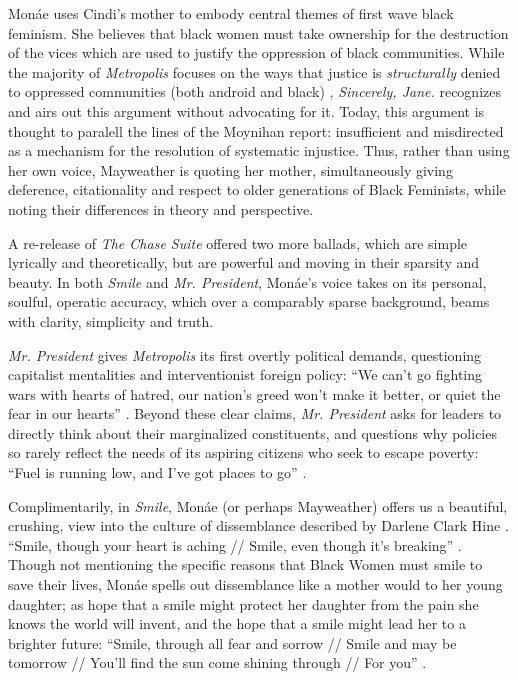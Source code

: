 \documentclass[a4paper, 11pt]{article} %
\begin{document}
Mon\'ae uses Cindi's mother to embody central themes of first wave black feminism.
She believes that black women must take ownership for the destruction of the vices which are used to justify the oppression of black communities. 
While the majority of \emph{Metropolis} focuses on the ways that justice is \emph{structurally} denied to oppressed communities (both android and black) \cite{queen}, \emph{Sincerely, Jane.} recognizes and airs out this argument without advocating for it.
Today, this argument is thought to paralell the lines of the Moynihan report: insufficient and misdirected as a mechanism for the resolution of systematic injustice. 
Thus, rather than using her own voice, Mayweather is quoting her mother, simultaneously giving deference, citationality and respect to older generations of Black Feminists, while noting their differences in theory and perspective.

A re-release of \emph{The Chase Suite} offered two more ballads, which are simple lyrically and theoretically, but are powerful and moving in their sparsity and beauty.
In both \emph{Smile} and \emph{Mr. President}, Mon\'ae's voice takes on its personal, soulful, operatic accuracy, which over a comparably sparse background, beams with clarity, simplicity and truth.

\emph{Mr. President} gives \emph{Metropolis} its first overtly political demands, questioning capitalist mentalities and interventionist foreign policy: 
``We can't go fighting wars with hearts of hatred, our nation's greed won't make it better, or quiet the fear in our hearts'' \cite{mrpresident}.
Beyond these clear claims, \emph{Mr. President} asks for leaders to directly think about their marginalized constituents, and questions why policies so rarely reflect the needs of its aspiring citizens who seek to escape poverty:
``Fuel is running low, and I've got places to go'' \cite{mrpresident}.

Complimentarily, in \emph{Smile}, Mon\'ae (or perhaps Mayweather) offers us a beautiful, crushing, view into the culture of dissemblance described by Darlene Clark Hine \cite{hine}.
``Smile, though your heart is aching // Smile, even though it's breaking'' \cite{smile}.
Though not mentioning the specific reasons that Black Women must smile to save their lives, Mon\'ae spells out dissemblance like a mother would to her young daughter; as hope that a smile might protect her daughter from the pain she knows the world will invent, and the hope that a smile might lead her to a brighter future:
``Smile, through all fear and sorrow // Smile and may be tomorrow // You'll find the sun come shining through // For you'' \cite{smile}.
\end{document}
